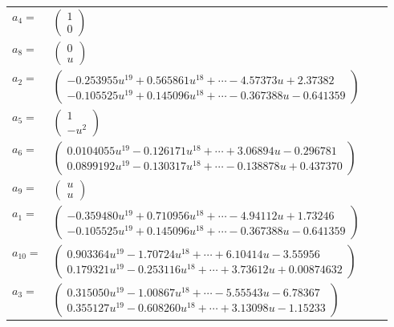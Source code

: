 \documentclass[1p]{elsarticle_modified}
\theoremstyle{definition}
\begin{document}
\begin{tabular}{m{7pt} m{180pt} m{7pt} m{180pt} }
\flushright $a_{4}=$&$\begin{pmatrix}1\\0\end{pmatrix}$ \\
\flushright $a_{8}=$&$\begin{pmatrix}0\\u\end{pmatrix}$ \\
\flushright $a_{2}=$&$\begin{pmatrix}-0.253955 u^{19}+0.565861 u^{18}+\cdots-4.57373 u+2.37382\\-0.105525 u^{19}+0.145096 u^{18}+\cdots-0.367388 u-0.641359\end{pmatrix}$ \\
\flushright $a_{5}=$&$\begin{pmatrix}1\\- u^2\end{pmatrix}$ \\
\flushright $a_{6}=$&$\begin{pmatrix}0.0104055 u^{19}-0.126171 u^{18}+\cdots+3.06894 u-0.296781\\0.0899192 u^{19}-0.130317 u^{18}+\cdots-0.138878 u+0.437370\end{pmatrix}$ \\
\flushright $a_{9}=$&$\begin{pmatrix}u\\u\end{pmatrix}$ \\
\flushright $a_{1}=$&$\begin{pmatrix}-0.359480 u^{19}+0.710956 u^{18}+\cdots-4.94112 u+1.73246\\-0.105525 u^{19}+0.145096 u^{18}+\cdots-0.367388 u-0.641359\end{pmatrix}$ \\
\flushright $a_{10}=$&$\begin{pmatrix}0.903364 u^{19}-1.70724 u^{18}+\cdots+6.10414 u-3.55956\\0.179321 u^{19}-0.253116 u^{18}+\cdots+3.73612 u+0.00874632\end{pmatrix}$ \\
\flushright $a_{3}=$&$\begin{pmatrix}0.315050 u^{19}-1.00867 u^{18}+\cdots-5.55543 u-6.78367\\0.355127 u^{19}-0.608260 u^{18}+\cdots+3.13098 u-1.15233\end{pmatrix}$ \\

\end{tabular}
\end{document}
